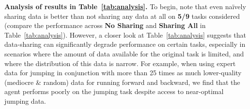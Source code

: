 \begin{table}[t]
         \caption{\footnotesize We analyze how sharing data across all tasks (\textbf{Sharing All}) compares to \textbf{No Sharing} in the multi-task walker2d environment with three tasks: run forward, run backward, and jump. We provide three scenarios with different styles of per-task offline datasets in the leftmost column. The second column shows the number of transitions in each dataset. We report the per-task average return, the KL divergence between the single-task optimal policy $\pi$ and the behavior policy $\behavior$ after the data sharing scheme, as well as averages across tasks. \textbf{Sharing All} generally helps training while increasing the KL divergence. However, on the row highlighted in yellow, \textbf{Sharing All} yields a particularly large KL divergence between the single-task $\pi$ and $\behavior$ and degrades the performance, suggesting sharing data for all tasks is brittle.
     \label{tab:analysis}
     \vspace{-0.6cm}
     }
\end{table}

\textbf{Analysis of results in Table~\ref{tab:analysis}.} To begin, note that even na\"ively sharing data is  better than not sharing any data at all on \textbf{5/9} tasks considered
(compare the performance across \textbf{No Sharing} and \textbf{Sharing All} in Table~\ref{tab:analysis}).
However, a closer look at Table~\ref{tab:analysis} suggests that data-sharing can significantly degrade performance on certain tasks, especially in scenarios where the amount of data available for the original task is limited, and where the distribution of this data is narrow.
For example, when using expert data for jumping in conjunction with more than 25 times as much lower-quality (mediocre \& random) data for running forward and backward, we find that the agent performs poorly on the jumping task despite access to near-optimal jumping data.

